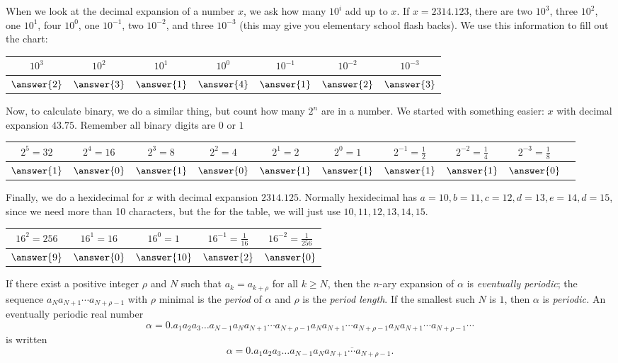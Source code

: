 \documentclass{ximera}
\begin{document}
\begin{example}
 When we look at the decimal expansion of a number $x$, we ask how many $10^{i}$ add up to $x$. If $x=2314.123$, there are two $10^3$, three $10^2$, one $10^1$, four $10^0$, one $10^{-1}$, two $10^{-2}$, and three $10^{-3}$ (this may give you elementary school flash backs). We use this information to fill out the chart:
 
\begin{tabular}{|c|c|c|c|c|c|c|}\hline
 $10^3$& $10^2$& $10^1$& $10^0$&$10^{-1}$&$10^{-2}$&$10^{-3}$\\\hline
 $\answer{2}$&$\answer{3}$&$\answer{1}$&$\answer{4}$&$\answer{1}$&$\answer{2}$&$\answer{3}$\\\hline
 \end{tabular}

Now, to calculate binary, we do a similar thing, but count how many $2^n$ are in a number. We started with something easier: $x$ with decimal expansion $43.75$. Remember all binary digits are $0$ or $1$

\begin{tabular}{|c|c|c|c|c|c|c|c|c|c|}\hline
 $2^5=32$& $2^4=16$& $2^3=8$& $2^2=4$& $2^1=2$& $2^0=1$&$2^{-1}=\frac{1}{2}$&$2^{-2}=\frac{1}{4}$&$2^{-3}=\frac{1}{8}$\\\hline
 $\answer{1}$&$\answer{0}$&$\answer{1}$&$\answer{0}$&$\answer{1}$&$\answer{1}$&$\answer{1}$&$\answer{1}$&$\answer{0}$\\\hline
 \end{tabular}
 
 Finally, we do a hexidecimal for $x$ with decimal expansion $2314.125$. Normally hexidecimal has $a=10, b=11,c=12,d=13,e=14,d=15$, since we need more than 10 characters, but the for the table, we will just use $10,11,12,13,14,15$.
 
 \begin{tabular}{|c|c|c|c|c|}\hline
$16^2=256$& $16^1=16$& $16^0=1$&$16^{-1}=\frac{1}{16}$&$16^{-2}=\frac{1}{256}$\\\hline
 $\answer{9}$&$\answer{0}$&$\answer{10}$&$\answer{2}$&$\answer{0}$\\\hline
 \end{tabular}
\end{example}
\begin{definition}
If there exist a positive integer $\rho$ and $N$ such that $a_k=a_{k+\rho}$ for all $k\geq N$, then the $n$-ary expansion of $\alpha$ is \emph{eventually periodic}; the sequence $a_Na_{N+1}\cdots a_{N+\rho-1}$ with $\rho$ minimal is the \emph{period} of $\alpha$ and $\rho$ is the \emph{period length}. If the smallest such $N$ is $1$, then $\alpha$ is \emph{periodic.}  An eventually periodic real number
 \[\alpha=0.a_1a_2a_3\dots a_{N-1}a_Na_{N+1}\cdots a_{N+\rho-1}a_Na_{N+1}\cdots a_{N+\rho-1}a_Na_{N+1}\cdots a_{N+\rho-1}\cdots\] is written \[\alpha=0.a_1a_2a_3\dots a_{N-1}\overline{a_Na_{N+1}\cdots a_{N+\rho-1}}.\]
\end{definition}
\end{document}
